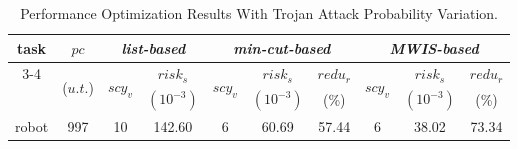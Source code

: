 \documentclass[10pt,journal]{IEEEtran}
\begin{document}
\begin{table}[!h]
\renewcommand{\arraystretch}{1.1}
\caption{Performance Optimization Results With Trojan Attack Probability Variation.}
\centering
\begin{tabular}{c|c|c|c|c|c|c|c|c|c}
\hline
\hline
\multirow{2}{*}{task}                  &\multirow{2}{*}{$pc$}        & \multicolumn{2}{c|}{\textit{list-based}}        &\multicolumn{3}{c|}{\textit{min-cut-based}}   &\multicolumn{3}{c}{\textit{MWIS-based}}        \\  \cline{3-4} \cline{5-7} \cline{8-10}
\multirow{2}{*}{graph}                 &\multirow{2}{*}{\hspace*{-1em}($u.t.$)\hspace*{-1em}}       &\multirow{2}{*}{\hspace*{-0.6em}$scy_v$\hspace*{-0.6em}}     & \hspace*{-0.6em}$risk_s$\hspace*{-0.6em}  &\multirow{2}{*}{\hspace*{-0.6em}$scy_v$\hspace*{-0.6em}}     &\hspace*{-0.6em}$risk_s$\hspace*{-0.6em}  &\hspace*{-0.4em}$redu_{r}$\hspace*{-0.4em}  &\multirow{2}{*}{\hspace*{-0.6em}$scy_v$\hspace*{-0.6em}}      &\hspace*{-0.6em}$risk_s$\hspace*{-0.6em}  &\hspace*{-0.4em}$redu_{r}$\hspace*{-0.4em}  \\
    &       &     & \hspace*{-0.8em}$(10^{-3})$\hspace*{-0.8em}  &     &\hspace*{-0.8em}$(10^{-3})$\hspace*{-0.8em} &(\%)   &     &\hspace*{-0.6em}$(10^{-3})$\hspace*{-0.6em} &(\%)   \\

\hline
\hline

robot                   &997  &10     &142.60   &6   &60.69 &\hspace*{-0.8em}57.44\hspace*{-0.8em}  &6   &38.02  &\hspace*{-0.8em}73.34\hspace*{-0.8em}   \\



\end{tabular}
\end{table}
\end{document}
